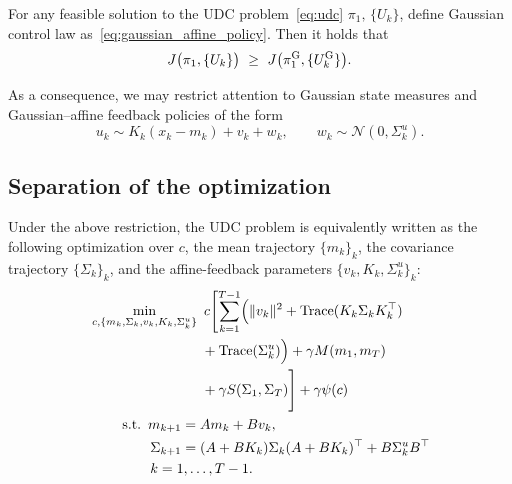 \documentclass{ifacconf}
\newcommand{\tr}{\mathop{\rm Trace}\nolimits}
\newcommand{\calN}{{\mathcal N}}
\begin{document}
\begin{thm}\label{thm:udc_gaussian_restriction}
    For any feasible solution to the UDC problem~\eqref{eq:udc} \(\pi_1,\,\{U_k\}\), define Gaussian control law as~\eqref{eq:gaussian_affine_policy}.
    Then it holds that 
    \[
    J\bigl(\pi_1,\{U_k\}\bigr)\ \ge\ J\bigl(\pi_1^{\rm G},\{U_k^{\rm G}\}\bigr).
    \]
\end{thm}

As a consequence, we may restrict attention to Gaussian state measures and Gaussian--affine feedback policies of the form
\[
u_k \sim K_k(x_k-m_k)+v_k+w_k,\qquad w_k\sim \calN(0,\Sigma^u_k).
\]
\subsection{Separation of the optimization}
\label{subsec:finite_dim_formulation}

Under the above restriction, the UDC problem is equivalently written as the following optimization over
$c$, the mean trajectory $\{m_k\}_{k}$, the covariance trajectory $\{\Sigma_k\}_{k}$, and the affine-feedback parameters $\{v_k,K_k,\Sigma^u_k\}_{k}$:
\begin{align}\label{eq:udc_reduced}
    &\min_{c,\{m_k,\Sigma_k,v_k,K_k,\Sigma^u_k\}} \,\,  c\Biggl[ \sum_{k=1}^{T-1}\Bigl(\|v_k\|^2 + \tr(K_k\Sigma_k K_k^\top) \nonumber\\
    & \qquad\qquad\qquad\qquad+ \tr(\Sigma^u_k)\Bigr) + \gamma M(m_1,m_T)  \nonumber\\
    & \qquad\qquad\qquad\qquad+ \gamma S(\Sigma_1,\Sigma_T) \Biggr] + \gamma \psi(c) \\
    &\qquad\,\, \text{s.t.}\,\,\, m_{k+1}=A m_k + B v_k,\nonumber\\
    & \qquad\qquad\,\,\Sigma_{k+1}=(A+BK_k)\Sigma_k(A+BK_k)^\top + B\Sigma^u_kB^\top \nonumber\\
    &\qquad\qquad\,\,k=1,\dots,T-1.\nonumber
\end{align}
\end{document}
